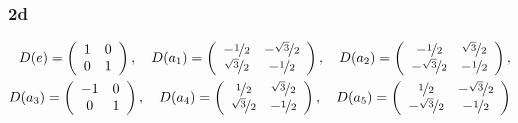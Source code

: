 \documentclass[10pt,a4paper]{book}
\theoremstyle{definition}
\begin{document}
\subsubsection{2d}
\begin{align}
D(e)=\left(\begin{array}{cc}
1 & 0\\
0 & 1
\end{array}
\right),\quad
D(a_1)=\left(\begin{array}{cc}
-\nicefrac{1}{2} & -\nicefrac{\sqrt{3}}{2}\\
 \nicefrac{\sqrt{3}}{2} & -\nicefrac{1}{2}
\end{array}
\right),\quad
D(a_2)=\left(\begin{array}{cc}
-\nicefrac{1}{2} & \nicefrac{\sqrt{3}}{2}\\
-\nicefrac{\sqrt{3}}{2} & -\nicefrac{1}{2}
\end{array}
\right),\\
D(a_3)=\left(\begin{array}{cc}
-1 & 0\\
0 & 1
\end{array}
\right),\quad
D(a_4)=\left(\begin{array}{cc}
\nicefrac{1}{2} & \nicefrac{\sqrt{3}}{2}\\
\nicefrac{\sqrt{3}}{2} & -\nicefrac{1}{2}
\end{array}
\right),\quad
D(a_5)=\left(\begin{array}{cc}
\nicefrac{1}{2} & -\nicefrac{\sqrt{3}}{2}\\
-\nicefrac{\sqrt{3}}{2} & -\nicefrac{1}{2}
\end{array}
\right)
\end{align}
\end{document}
